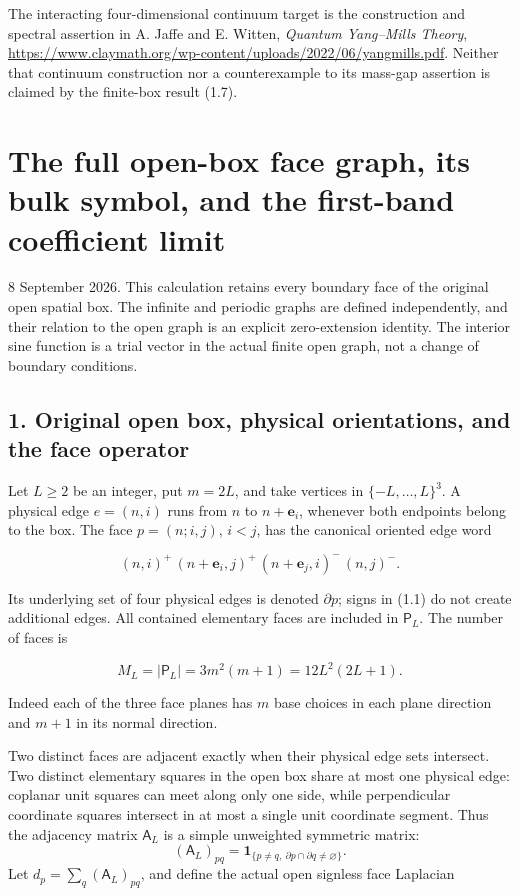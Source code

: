 \documentclass[
  11pt,
]{article}
\begin{document}
The interacting four-dimensional continuum target is the construction
and spectral assertion in A. Jaffe and E. Witten, \emph{Quantum
Yang--Mills Theory},
\url{https://www.claymath.org/wp-content/uploads/2022/06/yangmills.pdf}.
Neither that continuum construction nor a counterexample to its mass-gap
assertion is claimed by the finite-box result (1.7).

\clearpage
\section{The full open-box face graph, its bulk symbol, and the
first-band coefficient
limit}\label{magnetic-part-6-the-full-open-box-face-graph-its-bulk-symbol-and-the-first-band-coefficient-limit}

8 September 2026. This calculation retains every boundary face of the
original open spatial box. The infinite and periodic graphs are defined
independently, and their relation to the open graph is an explicit
zero-extension identity. The interior sine function is a trial vector in
the actual finite open graph, not a change of boundary conditions.

\subsection{1. Original open box, physical orientations, and the face
operator}\label{magnetic-part-6-original-open-box-physical-orientations-and-the-face-operator}

Let \(L\ge2\) be an integer, put \(m=2L\), and take vertices in
\(\{-L,\ldots,L\}^3\). A physical edge \(e=(n,i)\) runs from \(n\) to
\(n+\mathbf e_i\), whenever both endpoints belong to the box. The face
\(p=(n;i,j)\), \(i<j\), has the canonical oriented edge word

\[
(n,i)^+\,(n+\mathbf e_i,j)^+\,
(n+\mathbf e_j,i)^-\,(n,j)^-.
\tag{1.1}
\]

Its underlying set of four physical edges is denoted \(\partial p\);
signs in (1.1) do not create additional edges. All contained elementary
faces are included in \(\mathsf P_L\). The number of faces is

\[
M_L=|\mathsf P_L|=3m^2(m+1)=12L^2(2L+1).
\tag{1.2}
\]

Indeed each of the three face planes has \(m\) base choices in each
plane direction and \(m+1\) in its normal direction.

Two distinct faces are adjacent exactly when their physical edge sets
intersect. Two distinct elementary squares in the open box share at most
one physical edge: coplanar unit squares can meet along only one side,
while perpendicular coordinate squares intersect in at most a single
unit coordinate segment. Thus the adjacency matrix \(\mathsf A_L\) is a
simple unweighted symmetric matrix: \[
(\mathsf A_L)_{pq}=\mathbf1_{\{p\ne q,\ \partial p\cap\partial q\ne\varnothing\}}.
\] Let \(d_p=\sum_q(\mathsf A_L)_{pq}\), and define the actual open
signless face Laplacian
\end{document}
